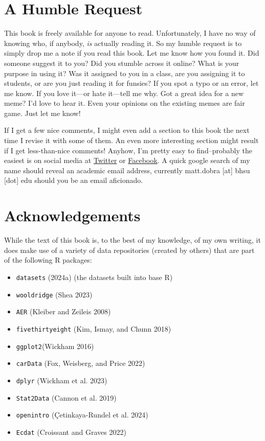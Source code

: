 \documentclass[
  letterpaper,
]{book}
\providecommand{\tightlist}{%
  \setlength{\itemsep}{0pt}\setlength{\parskip}{0pt}}\usepackage{longtable,booktabs,array}
\begin{document}
\section*{A Humble Request}\label{a-humble-request}


This book is freely available for anyone to read. Unfortunately, I have
no way of knowing who, if anybody, \emph{is} actually reading it. So my
humble request is to simply drop me a note if you read this book. Let me
know how you found it. Did someone suggest it to you? Did you stumble
across it online? What is your purpose in using it? Was it assigned to
you in a class, are you assigning it to students, or are you just
reading it for funsies? If you spot a typo or an error, let me know. If
you love it---or hate it---tell me why. Got a great idea for a new meme?
I'd love to hear it. Even your opinions on the existing memes are fair
game. Just let me know!

If I get a few nice comments, I might even add a section to this book
the next time I revise it with some of them. An even more interesting
section might result if I get less-than-nice comments! Anyhow, I'm
pretty easy to find--probably the easiest is on social media at
\href{https://twitter.com/mattdobra}{Twitter} or
\href{https://www.facebook.com/mattdobra/}{Facebook}. A quick google
search of my name should reveal an academic email address, currently
matt.dobra {[}at{]} bhsu {[}dot{]} edu should you be an email
aficionado.

\section*{Acknowledgements}\label{acknowledgements}


While the text of this book is, to the best of my knowledge, of my own
writing, it does make use of a variety of data repositories (created by
others) that are part of the following R packages:

\begin{itemize}
\tightlist
\item
  \texttt{datasets} (2024a) (the datasets built into base R)
\item
  \texttt{wooldridge} (Shea 2023)
\item
  \texttt{AER} (Kleiber and Zeileis 2008)
\item
  \texttt{fivethirtyeight} (Kim, Ismay, and Chunn 2018)
\item
  \texttt{ggplot2}(Wickham 2016)
\item
  \texttt{carData} (Fox, Weisberg, and Price 2022)
\item
  \texttt{dplyr} (Wickham et al. 2023)
\item
  \texttt{Stat2Data} (Cannon et al. 2019)
\item
  \texttt{openintro} (Çetinkaya-Rundel et al. 2024)
\item
  \texttt{Ecdat} (Croissant and Graves 2022)
\end{itemize}
\end{document}
